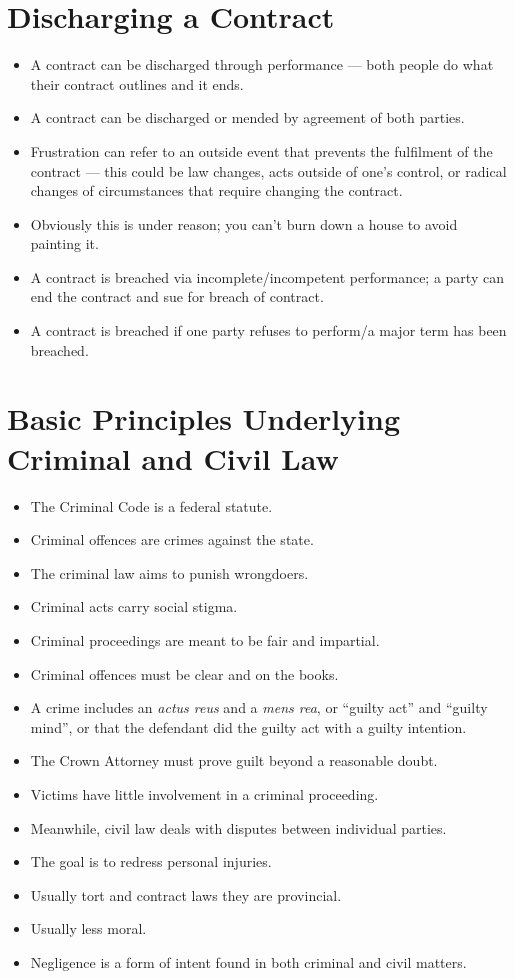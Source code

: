 \documentclass{article}
\begin{document}
\section{Discharging a Contract}
\begin{itemize}
    \item A contract can be discharged through performance --- both people do what their contract outlines and it ends.
    \item A contract can be discharged or mended by agreement of both parties.
    \item Frustration can refer to an outside event that prevents the fulfilment of the contract --- this could be law changes, acts outside of one's control, or radical changes of circumstances that require changing the contract.
    \item Obviously this is under reason; you can't burn down a house to avoid painting it.
    \item A contract is breached via incomplete/incompetent performance; a party can end the contract and sue for breach of contract.
    \item A contract is breached if one party refuses to perform/a major term has been breached.
\end{itemize}

\section{Basic Principles Underlying Criminal and Civil Law}
\begin{itemize}
    \item The Criminal Code is a federal statute.
    \item Criminal offences are crimes against the state.
    \item The criminal law aims to punish wrongdoers.
    \item Criminal acts carry social stigma.
    \item Criminal proceedings are meant to be fair and impartial.
    \item Criminal offences must be clear and on the books.
    \item A crime includes an \emph{actus reus} and a \emph{mens rea}, or ``guilty act'' and ``guilty mind'', or that the defendant did the guilty act with a guilty intention.
    \item The Crown Attorney must prove guilt beyond a reasonable doubt.
    \item Victims have little involvement in a criminal proceeding.
    \item Meanwhile, civil law deals with disputes between individual parties.
    \item The goal is to redress personal injuries.
    \item Usually tort and contract laws they are provincial.
    \item Usually less moral.
    \item Negligence is a form of intent found in both criminal and civil matters.
\end{itemize}
\end{document}
